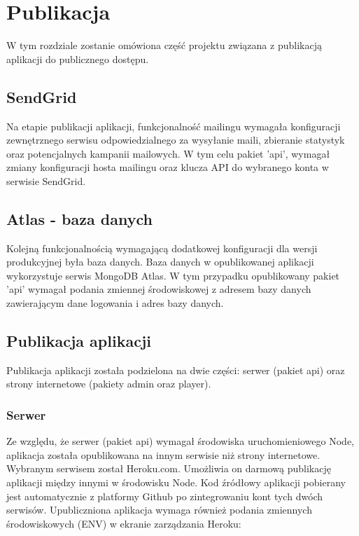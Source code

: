 \chapter{Publikacja}
\label{ch:funplenop}

W tym rozdziale zostanie omówiona część projektu związana z publikacją aplikacji do publicznego dostępu.

\label{publication:sendgrid}
\section{SendGrid}
Na etapie publikacji aplikacji, funkcjonalność mailingu wymagała konfiguracji zewnętrznego serwisu odpowiedzialnego za wysyłanie maili, zbieranie statystyk oraz potencjalnych kampanii mailowych. W tym celu pakiet 'api', wymagał zmiany konfiguracji hosta mailingu oraz klucza API do wybranego konta w serwisie SendGrid.

\section{Atlas - baza danych}
Kolejną funkcjonalnością wymagającą dodatkowej konfiguracji dla wersji produkcyjnej była baza danych. Baza danych w opublikowanej aplikacji wykorzystuje serwis MongoDB Atlas. W tym przypadku opublikowany pakiet 'api' wymagał podania zmiennej środowiskowej z adresem bazy danych zawierającym dane logowania i adres bazy danych.

\section{Publikacja aplikacji}
Publikacja aplikacji została podzielona na dwie części: serwer (pakiet api) oraz strony internetowe (pakiety admin oraz player).

\subsection{Serwer}
Ze względu, że serwer (pakiet api) wymagał środowiska uruchomieniowego Node, aplikacja została opublikowana na innym serwisie niż strony internetowe. Wybranym serwisem został Heroku.com. Umożliwia on darmową publikację aplikacji między innymi w środowisku Node. Kod źródłowy aplikacji pobierany jest automatycznie z platformy Github po zintegrowaniu kont tych dwóch serwisów. Upubliczniona aplikacja wymaga również podania zmiennych środowiskowych (ENV) w ekranie zarządzania Heroku:

